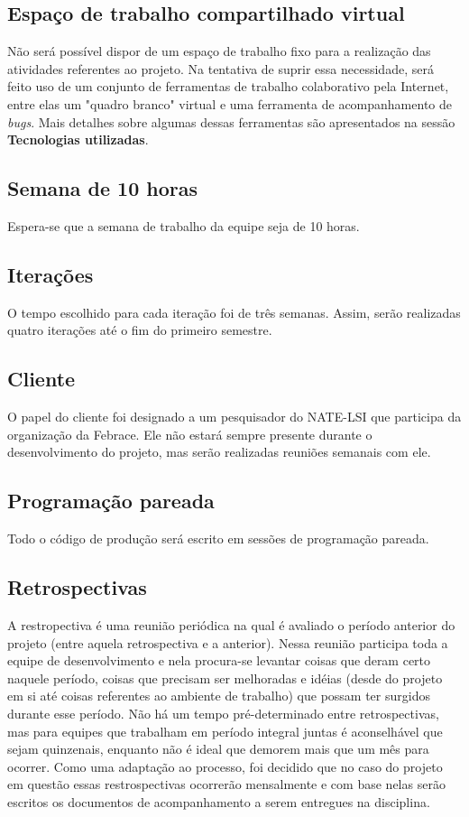 \documentclass[a4paper,12pt,font=plain,header=plain]{abnt}
\begin{document}
	\subsection{Espaço de trabalho compartilhado virtual}
		Não será possível dispor de um espaço de trabalho fixo para a realização das atividades referentes ao projeto. Na tentativa de suprir essa necessidade, será feito uso de um conjunto de ferramentas de trabalho colaborativo pela Internet, entre elas um "quadro branco" virtual e uma ferramenta de acompanhamento de \textit{bugs}. Mais detalhes sobre algumas dessas ferramentas são apresentados na sessão \textbf{Tecnologias utilizadas}.

	\subsection{Semana de 10 horas}
		Espera-se que a semana de trabalho da equipe seja de 10 horas.

	\subsection{Iterações}
		O tempo escolhido para cada iteração foi de três semanas. Assim, serão realizadas quatro iterações até o fim do primeiro semestre.

	\subsection{Cliente}
		O papel do cliente foi designado a um pesquisador do NATE-LSI que participa da organização da Febrace. Ele não estará sempre presente durante o desenvolvimento do projeto, mas serão realizadas reuniões semanais com ele.

	\subsection{Programação pareada}
		Todo o código de produção será escrito em sessões de programação pareada.

	\subsection{Retrospectivas}
		A restropectiva é uma reunião periódica na qual é avaliado o período anterior do projeto (entre aquela retrospectiva e a anterior). Nessa reunião participa toda a equipe de desenvolvimento e nela procura-se levantar coisas que deram certo naquele período, coisas que precisam ser melhoradas e idéias (desde do projeto em si até coisas referentes ao ambiente de trabalho) que possam ter surgidos durante esse período. Não há um tempo pré-determinado entre retrospectivas, mas para equipes que trabalham em período integral juntas é aconselhável que sejam quinzenais, enquanto não é ideal que demorem mais que um mês para ocorrer. Como uma adaptação ao processo, foi decidido que no caso do projeto em questão essas restrospectivas ocorrerão mensalmente e com base nelas serão escritos os documentos de acompanhamento a serem entregues na disciplina.
\end{document}
